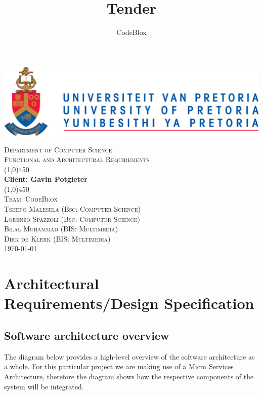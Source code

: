 \documentclass[a4paper,12pt]{article}
\author{CodeBlox}
\title{Tender}
\begin{document}
	\setlength{\parskip}{6pt}
	
	\begin{titlepage}
		\begin{center}
			\includegraphics[width=1\textwidth]{./Pictures/up_logo.png}\\[1.5cm] 
			\textsc{\LARGE Department of Computer Science} \\ [.5cm]
			\textsc{\Large Functional and Architectural Requirements} \\ [.5cm]
			\line(1,0){450}\\[.5cm]
			\huge{\bfseries Client: Gavin Potgieter}\\
			\line(1,0){450}\\[.5cm]
			\textsc{\LARGE Team: CodeBlox}\\ [0.5cm]
			
			
			\textsc{\large Tshepo Malesela (Bsc: Computer Science)}\\
			\textsc{\large Lorenzo Spazzoli (Bsc: Computer Science)}\\
			\textsc{\large Bilal Muhammad (BIS: Multimedia)}\\
			\textsc{\large Dirk de Klerk (BIS: Multimedia)}\\ [3.9cm]
			
			\large\today
		\end{center}
	\end{titlepage}
	
	\tableofcontents
	\thispagestyle{empty}
	\footnotesize
	\normalsize
	
	\newpage
	\section{Architectural Requirements/Design Specification}
	
	\subsection{Software architecture overview}
	
	The diagram below provides a high-level overview of the software architecture as a whole. For this particular project we are making use of a Micro Services Architecture, therefore the diagram shows how the respective components of the system will be integrated.\\
	
\end{document}
